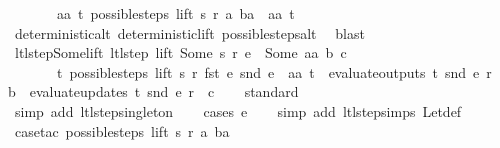 \begin{isabellebody}
\ \ \ \ \ \ \ {\isasymexists}aa\ t{\isachardot}\ possible{\isacharunderscore}steps\ lift\ s\ r\ a\ ba\ {\isacharequal}\ {\isacharbraceleft}{\isacharbar}{\isacharparenleft}aa{\isacharcomma}\ t{\isacharparenright}{\isacharbar}{\isacharbraceright}{\isachardoublequoteclose}\isanewline
%
\isadelimproof
\ \ %
\endisadelimproof
%
\isatagproof
{}\isamarkupfalse%
\ deterministic{\isacharunderscore}alt\ deterministic{\isacharunderscore}lift\ possible{\isacharunderscore}steps{\isacharunderscore}alt\ \isamarkupfalse%
\ blast%
\endisatagproof
{\isafoldproof}%
%
\isadelimproof
\isanewline
%
\endisadelimproof
\isanewline
{}\isamarkupfalse%
\ ltl{\isacharunderscore}step{\isacharunderscore}Some{\isacharunderscore}lift{\isacharcolon}\ {\isachardoublequoteopen}{\isacharparenleft}ltl{\isacharunderscore}step\ lift\ {\isacharparenleft}Some\ s{\isacharparenright}\ r\ e\ {\isacharequal}\ {\isacharparenleft}Some\ aa{\isacharcomma}\ b{\isacharcomma}\ c{\isacharparenright}{\isacharparenright}\ {\isacharequal}\isanewline
\ \ \ \ \ \ \ {\isacharparenleft}{\isasymexists}t{\isachardot}\ possible{\isacharunderscore}steps\ lift\ s\ r\ {\isacharparenleft}fst\ e{\isacharparenright}\ {\isacharparenleft}snd\ e{\isacharparenright}\ {\isacharequal}\ {\isacharbraceleft}{\isacharbar}{\isacharparenleft}aa{\isacharcomma}\ t{\isacharparenright}{\isacharbar}{\isacharbraceright}\ {\isasymand}\ evaluate{\isacharunderscore}outputs\ t\ {\isacharparenleft}snd\ e{\isacharparenright}\ r\ {\isacharequal}\ b\ {\isasymand}\ evaluate{\isacharunderscore}updates\ t\ {\isacharparenleft}snd\ e{\isacharparenright}\ r\ {\isacharequal}\ c{\isacharparenright}{\isachardoublequoteclose}\isanewline
%
\isadelimproof
\ \ %
\endisadelimproof
%
\isatagproof
{}\isamarkupfalse%
\ standard\isanewline
\ \ \ \isamarkupfalse%
\ {}\ \isamarkupfalse%
\ {\isacharparenleft}simp\ add{\isacharcolon}\ ltl{\isacharunderscore}step{\isacharunderscore}singleton{\isacharparenright}\isanewline
\ \ \isamarkupfalse%
\ {\isacharparenleft}cases\ e{\isacharparenright}\isanewline
\ \ \isamarkupfalse%
\ {\isacharparenleft}simp\ add{\isacharcolon}\ ltl{\isacharunderscore}step{\isachardot}simps\ Let{\isacharunderscore}def{\isacharparenright}\isanewline
\ \ \isamarkupfalse%
\ {\isacharparenleft}case{\isacharunderscore}tac\ {\isachardoublequoteopen}possible{\isacharunderscore}steps\ lift\ s\ r\ a\ ba\ {\isacharequal}\ {\isacharbraceleft}{\isacharbar}{\isacharbar}{\isacharbraceright}{\isachardoublequoteclose}{\isacharparenright}\isanewline

\end{isabellebody}
